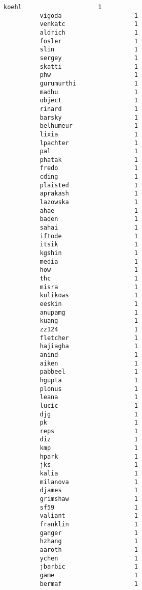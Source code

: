 \documentclass[11pt]{article}
\begin{document}
\begin{Verbatim}[commandchars=\\\{\}]
          koehl                     1
          vigoda                    1
          venkatc                   1
          aldrich                   1
          fosler                    1
          slin                      1
          sergey                    1
          skatti                    1
          phw                       1
          gurumurthi                1
          madhu                     1
          object                    1
          rinard                    1
          barsky                    1
          belhumeur                 1
          lixia                     1
          lpachter                  1
          pal                       1
          phatak                    1
          fredo                     1
          cding                     1
          plaisted                  1
          aprakash                  1
          lazowska                  1
          ahae                      1
          baden                     1
          sahai                     1
          iftode                    1
          itsik                     1
          kgshin                    1
          media                     1
          how                       1
          thc                       1
          misra                     1
          kulikows                  1
          eeskin                    1
          anupamg                   1
          kuang                     1
          zz124                     1
          fletcher                  1
          hajiagha                  1
          anind                     1
          aiken                     1
          pabbeel                   1
          hgupta                    1
          plonus                    1
          leana                     1
          lucic                     1
          djg                       1
          pk                        1
          reps                      1
          diz                       1
          kmp                       1
          hpark                     1
          jks                       1
          kalia                     1
          milanova                  1
          djames                    1
          grimshaw                  1
          sf59                      1
          valiant                   1
          franklin                  1
          ganger                    1
          hzhang                    1
          aaroth                    1
          ychen                     1
          jbarbic                   1
          game                      1
          bermaf                    1

\end{Verbatim}
\end{document}
